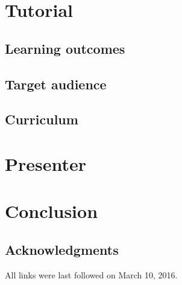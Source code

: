 \documentclass[runningheads,a4paper]{llncs}
\begin{document}

\section{Tutorial}\label{sec:tutorial}

\subsection{Learning outcomes}

\subsection{Target audience}

\subsection{Curriculum}


\section{Presenter}\label{sec:presenter}




\section{Conclusion}\label{sec:conclusion}

\subsection{Acknowledgments}






All links were last followed on March 10, 2016.
\end{document}
